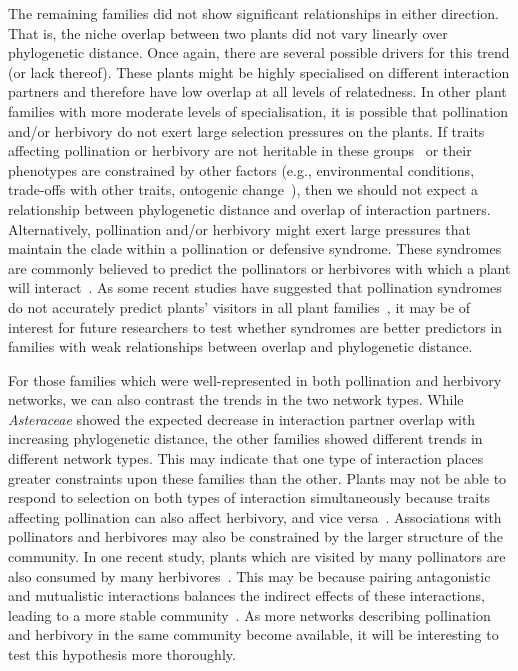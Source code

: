 \documentclass[12pt]{article}
\begin{document}
\begin{spacing}{1.5}
  The remaining families did not show significant relationships 
  in either direction. That is, the niche overlap between two 
  plants did not vary linearly over phylogenetic distance. Once again, there 
  are several possible drivers for this trend (or lack thereof). These plants might 
  be highly specialised on different interaction partners and therefore
  have low overlap at all levels of relatedness. In other plant families
  with more moderate levels of specialisation, it is possible 
  that pollination and/or herbivory do not exert large
  selection pressures on the plants. If traits affecting pollination
  or herbivory are not heritable in these groups~\citep{Kursar2009}
  or their phenotypes are constrained by other factors (e.g., 
  environmental conditions, trade-offs with other traits, ontogenic
  change~\citep{Karinho2014}), then we should not expect a relationship 
  between phylogenetic distance and overlap of interaction partners.
  Alternatively, pollination and/or herbivory might exert large 
  pressures that maintain the clade within a pollination or 
  defensive syndrome. These syndromes are commonly believed to
  predict the pollinators or herbivores with which a plant will 
  interact~\citep{Waser1996,Fenster2004,Ollerton2009,Johnson2014}.
  As some recent studies have suggested that pollination syndromes
  do not accurately predict plants' visitors in all plant 
  families~\citep{Ollerton2009},
  it may be of interest for future researchers to test whether 
  syndromes are better predictors in families with weak 
  relationships between overlap and phylogenetic distance.


  For those families which were well-represented in both pollination
  and herbivory networks, we can also contrast the 
  trends in the two network types. While \emph{Asteraceae} showed the
  expected decrease in interaction partner overlap with increasing
  phylogenetic distance, the other families showed different trends in
  different network types. This may indicate that one type of interaction
  places greater constraints upon these families than the other. Plants
  may not be able to respond to selection on both types of interaction
  simultaneously because traits affecting pollination can also affect herbivory, and vice
  versa~\citep{Strauss1997,Strauss2002,Adler2004,Adler2006,Theis2006}.
  Associations with pollinators and herbivores may also be constrained by the
  larger structure of the community. In one recent study, plants which are 
  visited by many pollinators are also consumed by many herbivores~\citep{Sauve2016}.
  This may be because pairing antagonistic and mutualistic interactions
  balances the indirect effects of these interactions, leading to a
  more stable community~\citep{Sauve2014}. As more networks describing 
  pollination and herbivory in the same community become available, it 
  will be interesting to test this hypothesis more thoroughly.



\end{spacing}
\end{document}
